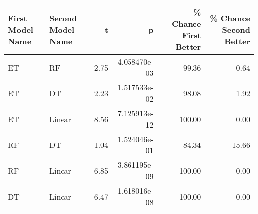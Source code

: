 \begin{tabular}{llrrrr}
\toprule
First Model Name & Second Model Name &    t &            p &  \% Chance First Better &  \% Chance Second Better \\
\midrule
              ET &                RF & 2.75 & 4.058470e-03 &                  99.36 &                    0.64 \\
              ET &                DT & 2.23 & 1.517533e-02 &                  98.08 &                    1.92 \\
              ET &            Linear & 8.56 & 7.125913e-12 &                 100.00 &                    0.00 \\
              RF &                DT & 1.04 & 1.524046e-01 &                  84.34 &                   15.66 \\
              RF &            Linear & 6.85 & 3.861195e-09 &                 100.00 &                    0.00 \\
              DT &            Linear & 6.47 & 1.618016e-08 &                 100.00 &                    0.00 \\
\bottomrule
\end{tabular}
